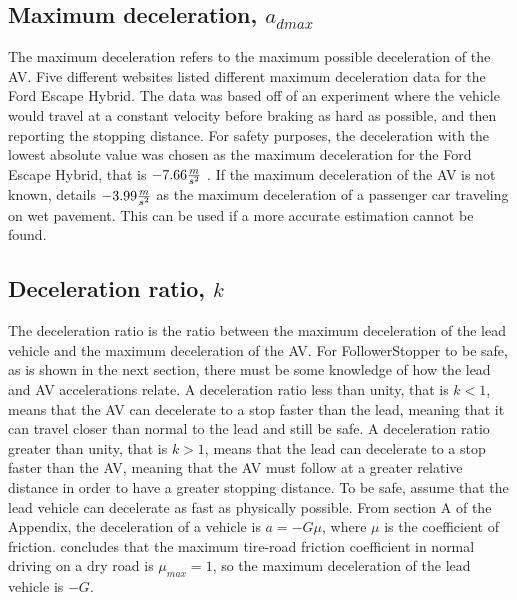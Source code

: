 \documentclass[conference]{IEEEtran}
\begin{document}
\subsection{Maximum deceleration, $a_{dmax}$}
The maximum deceleration refers to the maximum possible deceleration of the AV. Five different websites \cite{carsort,motortrend,caranddriver,edmunds,michigan} listed different maximum deceleration data for the Ford Escape Hybrid. The data was based off of an experiment where the vehicle would travel at a constant velocity before braking as hard as possible, and then reporting the stopping distance. For safety purposes, the deceleration with the lowest absolute value was chosen as the maximum deceleration for the Ford Escape Hybrid, that is $-7.66{m\over s^2}$ \cite{caranddriver}. If the maximum deceleration of the AV is not known, \cite{fambro1997nchrp} details $-3.99{m\over s^2}$ as the maximum deceleration of a passenger car traveling on wet pavement. This can be used if a more accurate estimation cannot be found.

\subsection{Deceleration ratio, $k$}
The deceleration ratio is the ratio between the maximum deceleration of the lead vehicle and the maximum deceleration of the AV. For FollowerStopper to be safe, as is shown in the next section, there must be some knowledge of how the lead and AV accelerations relate. A deceleration ratio less than unity, that is $k<1$, means that the AV can decelerate to a stop faster than the lead, meaning that it can travel closer than normal to the lead and still be safe. A deceleration ratio greater than unity, that is $k>1$, means that the lead can decelerate to a stop faster than the AV, meaning that the AV must follow at a greater relative distance in order to have a greater stopping distance. To be safe, assume that the lead vehicle can decelerate as fast as physically possible. From section A of the Appendix, the deceleration of a vehicle is $a=-G\mu$, where $\mu$ is the coefficient of friction. \cite{muller2003estimation} concludes that the maximum tire-road friction coefficient in normal driving on a dry road is $\mu_{max}=1$, so the maximum deceleration of the lead vehicle is $-G$.
\end{document}
